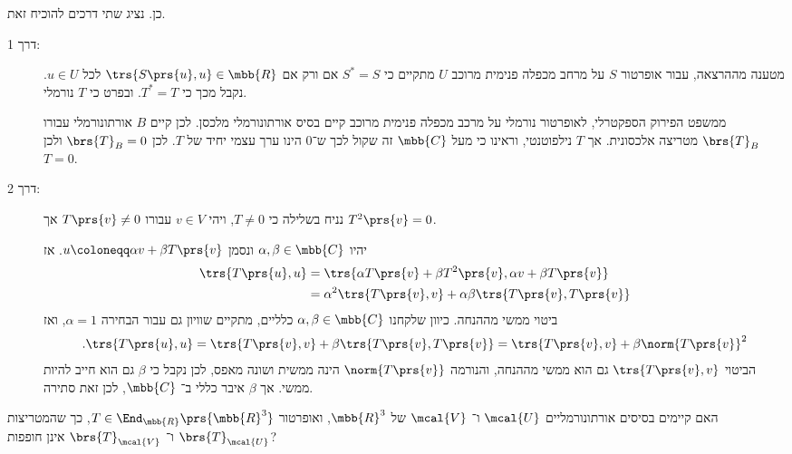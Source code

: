 \documentclass[a4paper,10pt,twoside,openany]{article}
\begin{document}
\begin{solution}
כן. נציג שתי דרכים להוכיח זאת.

\begin{description}
\item[דרך 1:]
מטענה מההרצאה, עבור אופרטור
$S$
על מרחב מכפלה פנימית מרוכב
$U$
מתקיים כי
$S^* = S$
אם ורק אם
$\trs{S\prs{u}, u} \in \mbb{R}$
לכל
$u \in U$.
נקבל מכך כי
$T^* = T$.
ובפרט כי
$T$
נורמלי.

ממשפט הפירוק הספקטרלי, לאופרטור נורמלי על מרכב מכפלה פנימית מרוכב קיים בסיס אורתונורמלי מלכסן.
לכן קיים
$B$
אורתונורמלי עבורו
$\brs{T}_B$
מטריצה אלכסונית.
אך
$T$
נילפוטנטי, וראינו כי מעל
$\mbb{C}$
זה שקול לכך ש־$0$ הינו ערך עצמי יחיד של
$T$.
לכן
$\brs{T}_B = 0$
ולכן
$T = 0$.

\item[דרך 2:]
נניח בשלילה כי
$T \neq 0$,
ויהי
$v \in V$
עבורו
$T\prs{v} \neq 0$
אך
$T^2\prs{v} = 0$.

יהיו
$\alpha, \beta \in \mbb{C}$
ונסמן
$u \coloneqq \alpha v + \beta T\prs{v}$.
אז
\begin{align*}
\trs{T\prs{u}, u} &=
\trs{\alpha T\prs{v} + \beta T^2\prs{v}, \alpha v + \beta T\prs{v}}
\\&=
\alpha^2 \trs{T\prs{v}, v} + \alpha \beta \trs{T\prs{v}, T\prs{v}}
\end{align*}
ביטוי ממשי מההנחה.
כיוון שלקחנו
$\alpha, \beta \in \mbb{C}$
כלליים, מתקיים שוויון גם עבור הבחירה
$\alpha = 1$,
ואז
\begin{align*}
\text{.} \trs{T\prs{u}, u} = \trs{T\prs{v}, v} + \beta \trs{T\prs{v}, T\prs{v}} = \trs{T\prs{v}, v} + \beta \norm{T\prs{v}}^2
\end{align*}
הביטוי
$\trs{T\prs{v}, v}$
גם הוא ממשי מההנחה, והנורמה
$\norm{T\prs{v}}$
הינה ממשית ושונה מאפס, לכן נקבל כי
$\beta$
גם הוא חייב להיות ממשי.
אך
$\beta$
איבר כללי ב־%
$\mbb{C}$,
לכן זאת סתירה.
\end{description}
\end{solution}

\newpage

\begin{question}
האם קיימים בסיסים אורתונורמליים
$\mcal{U}$
ו־%
$\mcal{V}$
של
$\mbb{R}^3$,
ואופרטור
$T \in \End_{\mbb{R}}\prs{\mbb{R}^3}$,
כך שהמטריצות
$\brs{T}_{\mcal{U}}$
ו־%
$\brs{T}_{\mcal{V}}$
אינן חופפות?
\end{question}
\end{document}
